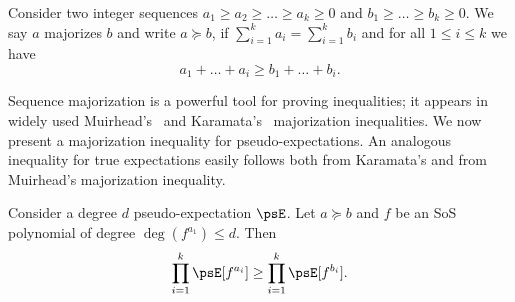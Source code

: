 \documentclass[11pt,a4paper]{article}
\begin{document}
\begin{definition}
    Consider two integer sequences \(a_1 \ge a_2 \ge \ldots \ge a_k \ge 0\)
    and \(b_1 \ge \ldots \ge b_k \ge 0\).
    We say \(a\) majorizes \(b\) and write \(a \succeq b\), if \(\sum_{i=1}^k a_i = \sum_{i=1}^k b_i\) and for all \(1 \le i \le k\) we have
    \[a_1 + \ldots + a_i \ge b_1 + \ldots + b_i.\]
\end{definition}
Sequence majorization is a powerful tool for proving inequalities; it appears in widely used Muirhead's~\cite{M1902} and Karamata's~\cite{K1932}  majorization inequalities. We now present a majorization inequality for pseudo-expectations. An analogous inequality for true expectations easily follows both from Karamata's and from Muirhead's majorization inequality. 
\begin{lemma}\label{lemma:ps_major}
Consider a degree $d$ pseudo-expectation $\psE$. Let \(a \succeq b\)  and \(f\) be an SoS polynomial of degree \(\deg(f^{a_1}) \le d\). Then
    \begin{equation}\label{eq:ps_major}
    \prod_{i=1}^k \psE[f^{a_i}] \ge \prod_{i=1}^k \psE[f^{b_i}].
    \end{equation}
\end{lemma}
\end{document}
